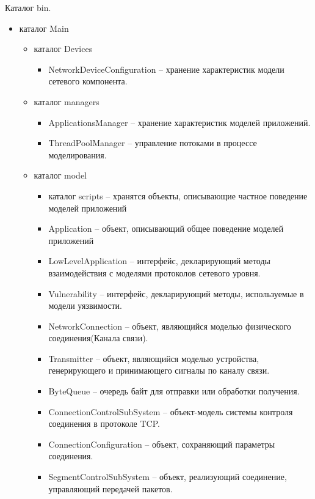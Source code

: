     Каталог bin.
    \begin{itemize}
        \item каталог Main
        \begin{itemize}
            \item каталог Devices
            \begin{itemize}
                \item NetworkDeviceConfiguration -- хранение характеристик модели сетевого компонента.
            \end{itemize}
            \item каталог managers
            \begin{itemize}
                \item ApplicationsManager -- хранение характеристик моделей приложений.
                \item ThreadPoolManager -- управление потоками в процессе моделирования.
            \end{itemize}
            \item каталог model
            \begin{itemize}
                        \item каталог scripts -- хранятся объекты, описывающие частное поведение моделей приложений
                        \item Application -- объект, описывающий общее поведение моделей приложений
                        \item LowLevelApplication -- интерфейс, декларирующий методы взаимодействия с моделями протоколов сетевого уровня.
                        \item Vulnerability -- интерфейс, декларирующий методы, используемые в модели уязвимости.
                        \item NetworkConnection -- объект, являющийся моделью физического соединения(Канала связи).
                        \item Transmitter -- объект, являющийся моделью устройства, генерирующего и принимающего сигналы по каналу связи.
                               \item ByteQueue -- очередь байт для отправки или обработки получения.
                               \item ConnectionControlSubSystem -- объект-модель системы контроля соединения в протоколе TCP.
                               \item ConnectionConfiguration -- объект, сохраняющий параметры соединения.
                               \item SegmentControlSubSystem -- объект, реализующий соединение, управляющий передачей пакетов.

\end{itemize}
\end{itemize}
\end{itemize}
